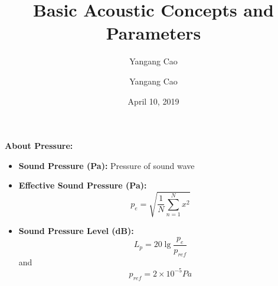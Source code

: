 \documentclass[10pt,a4paper,oneside]{beamer}
\author{Yangang Cao}
\author{Yangang Cao}
\title{Basic Acoustic Concepts and Parameters}
\date{April 10, 2019}
\begin{document}
	
\frame[plain]{\titlepage}

\begin{frame}
\vspace{0.5cm}
{\bfseries About Pressure:}
\vspace{0.3cm}
\begin{itemize}
	\item  {\bfseries Sound Pressure (Pa):}  Pressure of sound wave
	\item {\bfseries Effective Sound Pressure (Pa):} 
	\[
	p_e = \sqrt{\frac{1}{N}\sum_{n=1}^{N}x^2}
	\]
	\item {\bfseries Sound Pressure Level (dB):}
	\[
	L_p = 20\lg\frac{p_e}{p_{ref}}
	\]
	and
	\[
	p_{ref} = 2 \times 10^{-5}Pa
	\]
\end{itemize}
\end{frame}
\end{document}
